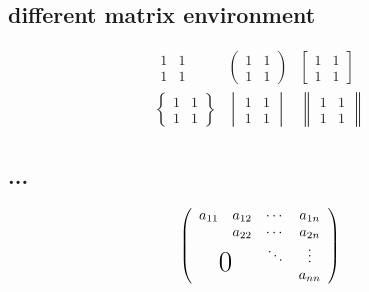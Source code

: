 \documentclass[11pt]{article}
\begin{document}
\subsection{different matrix environment}
$$
\begin{matrix}
\begin{matrix}
1& 1\\1 & 1\end{matrix}&
\begin{pmatrix}
1&1\\1&1\end{pmatrix}&
\begin{bmatrix}
1&1\\1&1\end{bmatrix}\\[12pt]
\begin{Bmatrix}
1&1\\1&1
\end{Bmatrix}&
\begin{vmatrix}
1&1\\1&1
\end{vmatrix}&
\begin{Vmatrix}
1&1\\1&1
\end{Vmatrix}
\end{matrix}
$$
\subsection{...}
$$
\left(\begin{array}{cccc}
a_{11} & a_{12} & \cdots & a_{1n}\\
& a_{22} & \cdots & a_{2n}\\
& & \ddots & \vdots\\
\multicolumn{2}{c}{\raisebox{1.3ex}[0pt]{\huge 0}}&&a_{nn}
\end{array}\right)
$$
\end{document}
